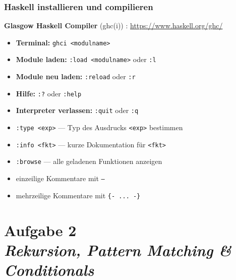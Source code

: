 \documentclass{beamer}
\begin{document}
	\begin{frame}\frametitle{Haskell installieren und compilieren}
		\textbf{Glasgow Haskell Compiler} (ghc(i)) :  \url{https://www.haskell.org/ghc/}
		
		\pause
		
		\begin{itemize}
			\item \textbf{Terminal:} \texttt{ghci <modulname>}
			\item \textbf{Module laden: } \texttt{:load <modulname>} oder \texttt{:l}
			\item \textbf{Module neu laden: } \texttt{:reload} oder \texttt{:r}
			\item \textbf{Hilfe: } \texttt{:?} oder \texttt{:help}
			\item \textbf{Interpreter verlassen: } \texttt{:quit} oder \texttt{:q}
			
			\bigskip \pause
			
			\item \texttt{:type <exp>} --- Typ des Ausdrucks \texttt{<exp>} bestimmen
			\item \texttt{:info <fkt>} --- kurze Dokumentation für \texttt{<fkt>}
			\item \texttt{:browse} --- alle geladenen Funktionen anzeigen
			
			\bigskip \pause
			
			\item einzeilige Kommentare mit \texttt{--}
			\item mehrzeilige Kommentare mit \texttt{\{- ... -\}}
		\end{itemize}
	\end{frame}



	\section{Aufgabe 2 \\ \textit{\normalsize Rekursion, Pattern Matching \& Conditionals}}
	
\end{document}
